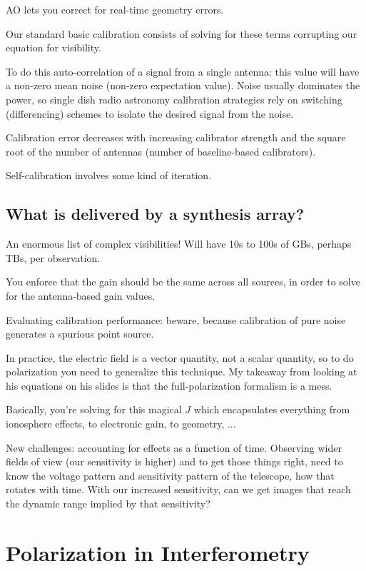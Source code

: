\documentclass[a4paper]{article}
\begin{document}
AO lets you correct for real-time geometry errors. 

Our standard basic calibration consists of solving for these terms corrupting our equation for visibility. 

To do this auto-correlation of a signal from a single antenna: this value will have a non-zero mean noise (non-zero expectation value). Noise usually dominates the power, so single dish radio astronomy calibration strategies rely on switching (differencing) schemes to isolate the desired signal from the noise. 

Calibration error decreases with increasing calibrator strength and the square root of the number of antennas (number of baseline-based calibrators). 

Self-calibration involves some kind of iteration. 

\subsection{What is delivered by a synthesis array?}

An enormous list of complex visibilities! Will have 10s to 100s of GBs, perhaps TBs, per observation. 

You enforce that the gain should be the same across all sources, in order to solve for the antenna-based gain values. 

Evaluating calibration performance: beware, because calibration of pure noise generates a spurious point source. 

In practice, the electric field is a vector quantity, not a scalar quantity, so to do polarization you need to generalize this technique. My takeaway from looking at his equations on his slides is that the full-polarization formalism is a mess. 

Basically, you're solving for this magical $J$ which encapsulates everything from ionosphere effects, to electronic gain, to geometry, ...

New challenges: accounting for effects as a function of time. Observing wider fields of view (our sensitivity is higher) and to get those things right, need to know the voltage pattern and sensitivity pattern of the telescope, how that rotates with time. With our increased sensitivity, can we get images that reach the dynamic range implied by that sensitivity? 

\section{Polarization in Interferometry}
\end{document}
